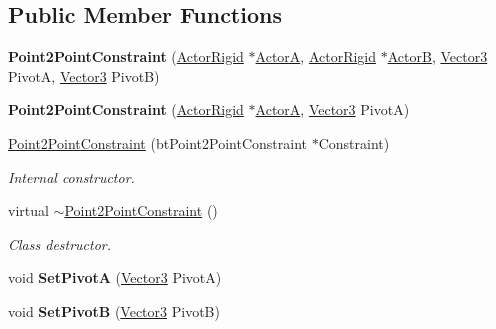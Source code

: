 \subsection*{Public Member Functions}
\begin{DoxyCompactItemize}
\item 
\hypertarget{classphys_1_1Point2PointConstraint_a817faa8a66b6193eead274668d7e3225}{
{\bfseries Point2PointConstraint} (\hyperlink{classphys_1_1ActorRigid}{ActorRigid} $\ast$\hyperlink{classphys_1_1TypedConstraint_a0fefb80c80d433bec9942b851b2f5a8a}{ActorA}, \hyperlink{classphys_1_1ActorRigid}{ActorRigid} $\ast$\hyperlink{classphys_1_1TypedConstraint_a04d2c49698d9a161e92112dd1efc1dcd}{ActorB}, \hyperlink{classphys_1_1Vector3}{Vector3} PivotA, \hyperlink{classphys_1_1Vector3}{Vector3} PivotB)}
\label{da/dfb/classphys_1_1Point2PointConstraint_a817faa8a66b6193eead274668d7e3225}

\item 
\hypertarget{classphys_1_1Point2PointConstraint_a8bcce8f4364fa9b305392082118c7f48}{
{\bfseries Point2PointConstraint} (\hyperlink{classphys_1_1ActorRigid}{ActorRigid} $\ast$\hyperlink{classphys_1_1TypedConstraint_a0fefb80c80d433bec9942b851b2f5a8a}{ActorA}, \hyperlink{classphys_1_1Vector3}{Vector3} PivotA)}
\label{da/dfb/classphys_1_1Point2PointConstraint_a8bcce8f4364fa9b305392082118c7f48}

\item 
\hyperlink{classphys_1_1Point2PointConstraint_a73c530c760f31032e23955567f634978}{Point2PointConstraint} (btPoint2PointConstraint $\ast$Constraint)
\begin{DoxyCompactList}\small\item\em Internal constructor. \item\end{DoxyCompactList}\item 
virtual \hyperlink{classphys_1_1Point2PointConstraint_aa735ad83877ff57a8a49269a87a46253}{$\sim$Point2PointConstraint} ()
\begin{DoxyCompactList}\small\item\em Class destructor. \item\end{DoxyCompactList}\item 
\hypertarget{classphys_1_1Point2PointConstraint_a2582531a664e1b05c6d50a2947dff1c5}{
void {\bfseries SetPivotA} (\hyperlink{classphys_1_1Vector3}{Vector3} PivotA)}
\label{da/dfb/classphys_1_1Point2PointConstraint_a2582531a664e1b05c6d50a2947dff1c5}

\item 
\hypertarget{classphys_1_1Point2PointConstraint_a6daf7e67fd6689dc18979fea5f745aa2}{
void {\bfseries SetPivotB} (\hyperlink{classphys_1_1Vector3}{Vector3} PivotB)}
\label{da/dfb/classphys_1_1Point2PointConstraint_a6daf7e67fd6689dc18979fea5f745aa2}


\end{DoxyCompactItemize}
